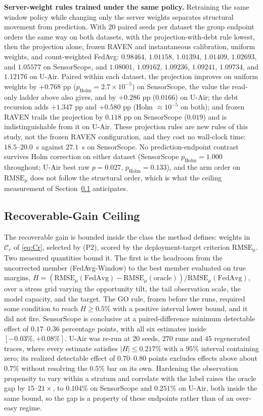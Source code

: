 \documentclass[letterpaper,journal]{IEEEtran}
\begin{document}
\noindent\textbf{Server-weight rules trained under the same policy.}
Retraining the same window policy while changing only the server weights
separates structural movement from prediction.  With 20 paired seeds per dataset
the group endpoint orders the same way on both datasets, with the
projection-with-debt rule lowest, then the projection alone, frozen RAVEN and
instantaneous calibration, uniform weights, and count-weighted FedAvg: $0.98464$,
$1.01158$, $1.01394$, $1.01409$, $1.02693$, and $1.05577$ on SensorScope, and
$1.08001$, $1.09162$, $1.09236$, $1.09241$, $1.09734$, and $1.12176$ on U-Air.
Paired within each dataset, the projection improves on uniform weights by
$+0.768$ pp ($p_{\mathrm{Holm}}=2.7\times10^{-5}$) on SensorScope, the value the
read-only ladder above also gives, and by $+0.286$ pp ($0.0166$) on U-Air; the
debt recursion adds $+1.347$ pp and $+0.580$ pp (Holm $\approx10^{-5}$ on both);
and frozen RAVEN trails the projection by $0.118$ pp on SensorScope ($0.019$) and
is indistinguishable from it on U-Air.  These projection rules are new rules of
this study, not the frozen RAVEN configuration, and they cost no wall-clock time:
$18.5$--$20.0$~s against $27.1$~s on SensorScope.  No prediction-endpoint
contrast survives Holm correction on either dataset (SensorScope
$p_{\mathrm{Holm}}=1.000$ throughout; U-Air best raw $p=0.027$,
$p_{\mathrm{Holm}}=0.133$), and the arm order on $\mathrm{RMSE}_{\mu}$ does not
follow the structural order, which is what the ceiling measurement of
Section~\ref{subsec:ceiling} anticipates.

\subsection{Recoverable-Gain Ceiling}
\label{subsec:ceiling}

The recoverable gain is bounded inside the class the method defines: weights in
$\mathcal{C}_r$ of \eqref{eq:Cr}, selected by (P2), scored by the
deployment-target criterion $\mathrm{RMSE}_{\mu}$.  Two measured quantities bound
it.  The first is the headroom from the uncorrected member (FedAvg-Window) to the
best member evaluated on true margins,
$H=(\mathrm{RMSE}_{\mu}(\text{FedAvg})-\mathrm{RMSE}_{\mu}(\text{oracle}))/\mathrm{RMSE}_{\mu}(\text{FedAvg})$,
over a stress grid varying the opportunity tilt, the tail observation scale, the
model capacity, and the target.  The GO rule, frozen before the runs, required
some condition to reach $H\ge0.5\%$ with a positive interval lower bound, and it
did not fire.  SensorScope is conclusive at a paired-difference minimum
detectable effect of $0.17$--$0.36$ percentage points, with all six estimates
inside $[-0.03\%,+0.08\%]$.  U-Air was re-run at $20$ seeds, $270$ runs and $45$
regenerated traces, where every estimate satisfies $|H|\le0.217\%$ with a $95\%$
interval containing zero; its realized detectable effect of $0.70$--$0.80$ points
excludes effects above about $0.7\%$ without resolving the $0.5\%$ bar on its
own.  Hardening the observation propensity to vary within a stratum and correlate
with the label raises the oracle gap by $15$--$21\times$, to $0.104\%$ on
SensorScope and $0.251\%$ on U-Air, both inside the same bound, so the gap is a
property of these endpoints rather than of an over-easy regime.
\end{document}
